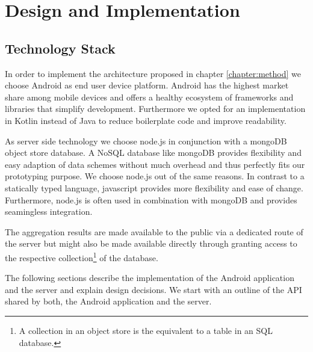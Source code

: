 \chapter{Design and Implementation}\label{chapter:design}

\section{Technology Stack}
In order to implement the architecture proposed in chapter \ref{chapter:method} we choose Android as end user device platform. Android has the highest market share among mobile devices \cite{android-market-share} and offers a healthy ecosystem of frameworks and libraries that simplify development. Furthermore we opted for an implementation in Kotlin instead of Java to reduce boilerplate code and improve readability.

As server side technology we choose node.js in conjunction with a mongoDB object store database. A NoSQL database like mongoDB provides flexibility and easy adaption of data schemes without much overhead and thus perfectly fits our prototyping purpose. We choose node.js out of the same reasons. In contrast to a statically typed language, javascript provides more flexibility and ease of change. Furthermore, node.js is often used in combination with mongoDB and provides seamingless integration.

The aggregation results are made available to the public via a dedicated route of the server but might also be made available directly through granting access to the respective collection\footnote{A collection in an object store is the equivalent to a table in an SQL database.} of the database.

The following sections describe the implementation of the Android application and the server and explain design decisions. We start with an outline of the API shared by both, the Android application and the server.\\

